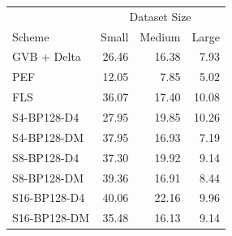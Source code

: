 \begin{tabular}{lrrr}
\toprule
 & \multicolumn{3}{c}{Dataset Size} \\
Scheme & Small & Medium & Large \\
\midrule
GVB + Delta & 26.46 & 16.38 & 7.93 \\
PEF & 12.05 & 7.85 & 5.02 \\
FLS & 36.07 & 17.40 & 10.08 \\
S4-BP128-D4 & 27.95 & 19.85 & 10.26 \\
S4-BP128-DM & 37.95 & 16.93 & 7.19 \\
S8-BP128-D4 & 37.30 & 19.92 & 9.14 \\
S8-BP128-DM & 39.36 & 16.91 & 8.44 \\
S16-BP128-D4 & 40.06 & 22.16 & 9.96 \\
S16-BP128-DM & 35.48 & 16.13 & 9.14 \\
\bottomrule
\end{tabular}
